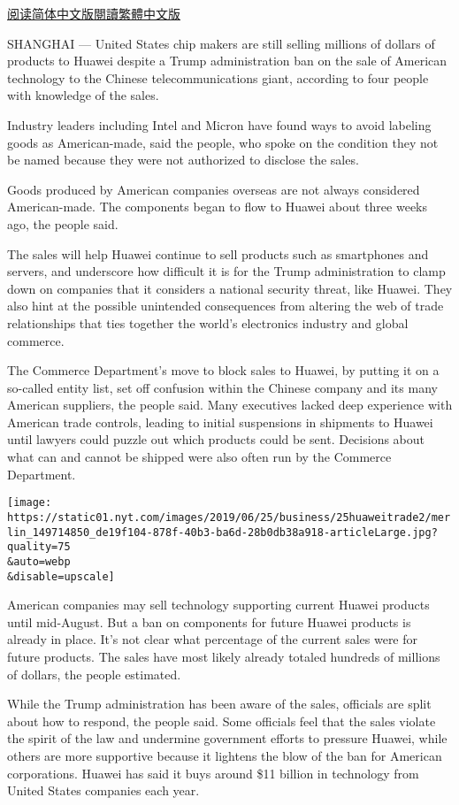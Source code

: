 \href{https://cn.nytimes.com/business/20190626/huawei-trump-ban-technology/}{阅读简体中文版}\href{https://cn.nytimes.com/business/20190626/huawei-trump-ban-technology/zh-hant/}{閱讀繁體中文版}

SHANGHAI --- United States chip makers are still selling millions of
dollars of products to Huawei despite a Trump administration ban on the
sale of American technology to the Chinese telecommunications giant,
according to four people with knowledge of the sales.

Industry leaders including Intel and Micron have found ways to avoid
labeling goods as American-made, said the people, who spoke on the
condition they not be named because they were not authorized to disclose
the sales.

Goods produced by American companies overseas are not always considered
American-made. The components began to flow to Huawei about three weeks
ago, the people said.

The sales will help Huawei continue to sell products such as smartphones
and servers, and underscore how difficult it is for the Trump
administration to clamp down on companies that it considers a national
security threat, like Huawei. They also hint at the possible unintended
consequences from altering the web of trade relationships that ties
together the world's electronics industry and global commerce.

The Commerce Department's move to block sales to Huawei, by putting it
on a so-called entity list, set off confusion within the Chinese company
and its many American suppliers, the people said. Many executives lacked
deep experience with American trade controls, leading to initial
suspensions in shipments to Huawei until lawyers could puzzle out which
products could be sent. Decisions about what can and cannot be shipped
were also often run by the Commerce Department.

\texttt{[image: https://static01.nyt.com/images/2019/06/25/business/25huaweitrade2/merlin\_149714850\_de19f104-878f-40b3-ba6d-28b0db38a918-articleLarge.jpg?quality=75\\\&auto=webp\\\&disable=upscale]}

American companies may sell technology supporting current Huawei
products until mid-August. But a ban on components for future Huawei
products is already in place. It's not clear what percentage of the
current sales were for future products. The sales have most likely
already totaled hundreds of millions of dollars, the people estimated.

While the Trump administration has been aware of the sales, officials
are split about how to respond, the people said. Some officials feel
that the sales violate the spirit of the law and undermine government
efforts to pressure Huawei, while others are more supportive because it
lightens the blow of the ban for American corporations. Huawei has said
it buys around \$11 billion in technology from United States companies
each year.

